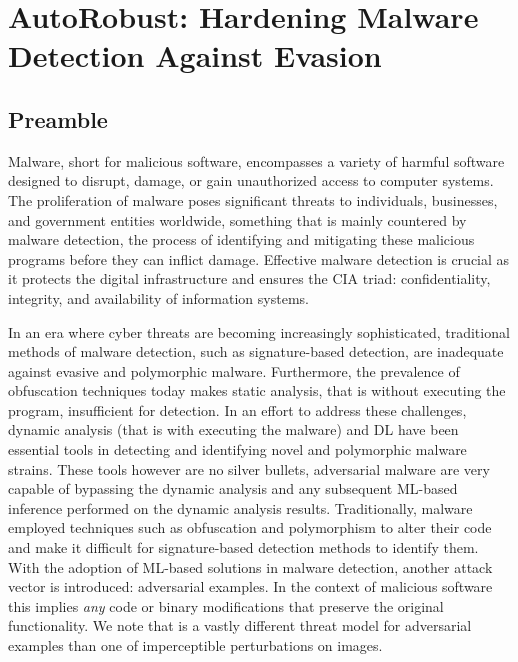 \chapter{AutoRobust: Hardening Malware Detection Against Evasion}\label{ch:autorobust}
\section*{Preamble}

Malware, short for malicious software, encompasses a variety of harmful software designed to disrupt, damage, or gain unauthorized access to computer systems.
The proliferation of malware poses significant threats to individuals, businesses, and government entities worldwide, something that is mainly countered by malware detection, the process of identifying and mitigating these malicious programs before they can inflict damage.
Effective malware detection is crucial as it protects the digital infrastructure and ensures the CIA triad: confidentiality, integrity, and availability of information systems.

In an era where cyber threats are becoming increasingly sophisticated, traditional methods of malware detection, such as signature-based detection, are inadequate against evasive and polymorphic malware.
Furthermore, the prevalence of obfuscation techniques today makes static analysis, that is without executing the program, insufficient for detection.
In an effort to address these challenges, dynamic analysis (that is with executing the malware) and \gls{DL} have been essential tools in detecting and identifying novel and polymorphic malware strains.
These tools however are no silver bullets, adversarial malware are very capable of bypassing the dynamic analysis and any subsequent ML-based inference performed on the dynamic analysis results.
Traditionally, malware employed techniques such as obfuscation and polymorphism to alter their code and make it difficult for signature-based detection methods to identify them.
With the adoption of ML-based solutions in malware detection,
another attack vector is introduced: adversarial examples.
In the context of malicious software this implies \textit{any} code or binary modifications that preserve the original functionality.
We note that is a vastly different threat model for adversarial examples than one of imperceptible perturbations on images.


